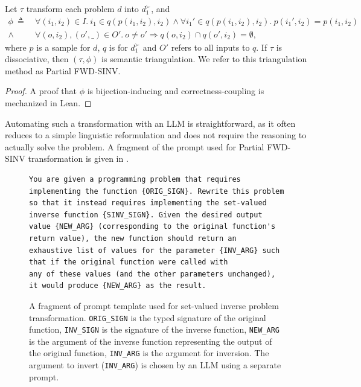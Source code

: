 \documentclass[acmsmall,screen,nonacm]{acmart}
\begin{document}
\begin{proposition}
  Let $\tau$ transform each problem $d$ into $d^{\succ}_1$, and
\begin{align*}
\phi\ \triangleq&\ \forall (i_1, i_2) \in I.\ i_1 \in q(p(i_1, i_2), i_2) \wedge \forall i_1' \in q(p(i_1, i_2), i_2).\ p(i_1', i_2) = p(i_1, i_2)\\
\wedge&\ \forall (o, i_2), (o', \_)\in O'.\ o \neq o' \Rightarrow q(o, i_2) \cap q(o', i_2) = \emptyset,
\end{align*}
where $p$ is a sample for $d$, $q$ is for $d^{\succ}_1$ and $O'$ refers to all inputs to $q$. If $\tau$ is dissociative, then $(\tau, \phi)$ is semantic triangulation. We refer to this triangulation method as Partial FWD-SINV.
\end{proposition}

\begin{proof}
  A proof that $\phi$ is bijection-inducing and correctness-coupling is mechanized in Lean.
\end{proof}

Automating such a transformation with an LLM is straightforward, as it often reduces to a simple linguistic reformulation and does not require the reasoning to actually solve the problem. A fragment of the prompt used for Partial FWD-SINV transformation is given in .

\begin{figure}[t]
    \centering
        {\scriptsize
      \begin{tcolorbox}[mybox,title={SINV problem transformation prompt template}]
      \begin{verbatim}
You are given a programming problem that requires implementing the function {ORIG_SIGN}. Rewrite this problem
so that it instead requires implementing the set-valued inverse function {SINV_SIGN}. Given the desired output
value {NEW_ARG} (corresponding to the original function's return value), the new function should return an
exhaustive list of values for the parameter {INV_ARG} such that if the original function were called with
any of these values (and the other parameters unchanged), it would produce {NEW_ARG} as the result.
      \end{verbatim}
      \end{tcolorbox}
    }
    \vspace{-4mm}
\caption{\label{fig:sinv_transformation_prompt}A fragment of prompt template used for set-valued inverse problem transformation. \texttt{ORIG\_SIGN} is the typed signature of the original function, \texttt{INV\_SIGN} is the signature of the inverse function, \texttt{NEW\_ARG} is the argument of the inverse function representing the output of the original function, \texttt{INV\_ARG} is the argument for inversion. The argument to invert (\texttt{INV\_ARG}) is chosen by an LLM using a separate prompt.}
\vspace{-3mm}
\end{figure}
\end{document}

